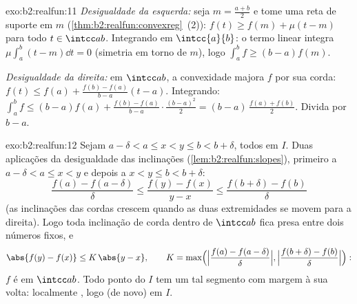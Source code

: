 \begin{solution}{exo:b2:realfun:11}
\emph{Desigualdade da esquerda:} seja $m = \frac{a+b}2$ e tome uma reta de
suporte em $m$ (\cref{thm:b2:realfun:convexreg}~(2)): $f(t) \geq
f(m) + \mu(t - m)$ para todo $t \in \intcc ab$. Integrando em
$\intcc{a}{b}$: o termo linear integra $\mu\int_a^b(t -
m)\dd t = 0$ (simetria em torno de $m$), logo $\int_a^b f \geq (b -
a)f(m)$.

\emph{Desigualdade da direita:} em $\intcc ab$, a convexidade majora $f$ por
sua corda: $f(t) \leq f(a) + \frac{f(b) - f(a)}{b - a}(t - a)$.
Integrando: $\int_a^b f \leq (b-a)f(a) + \frac{f(b) - f(a)}{b -
a}\cdot\frac{(b-a)^2}2 = (b - a)\,\frac{f(a) + f(b)}2$. Divida por
$b - a$.
\end{solution}

\begin{solution}{exo:b2:realfun:12}
Sejam $a - \delta < a \leq x < y \leq b < b + \delta$, todos em $I$.
Duas aplicações da desigualdade das inclinações
(\cref{lem:b2:realfun:slopes}), primeiro a $a - \delta < a \leq x <
y$ e depois a $x < y \leq b < b + \delta$:
\[
\frac{f(a) - f(a - \delta)}{\delta}
\leq \frac{f(y) - f(x)}{y - x}
\leq \frac{f(b + \delta) - f(b)}{\delta}
\]
(as inclinações das cordas crescem quando as duas extremidades se movem para a direita). Logo
toda inclinação de corda dentro de $\intcc ab$ fica presa entre dois números
fixos, e
\[
\abs{f(y) - f(x)} \leq K\,\abs{y - x},
\qquad
K = \max\Bigl(\Bigl|\frac{f(a) - f(a-\delta)}{\delta}\Bigr|,
\Bigl|\frac{f(b+\delta) - f(b)}{\delta}\Bigr|\Bigr):
\]
$f$ é  em $\intcc ab$. Todo ponto do  $I$ tem
um tal segmento com margem à sua volta: localmente , logo
(de novo)  em $I$.
\end{solution}


